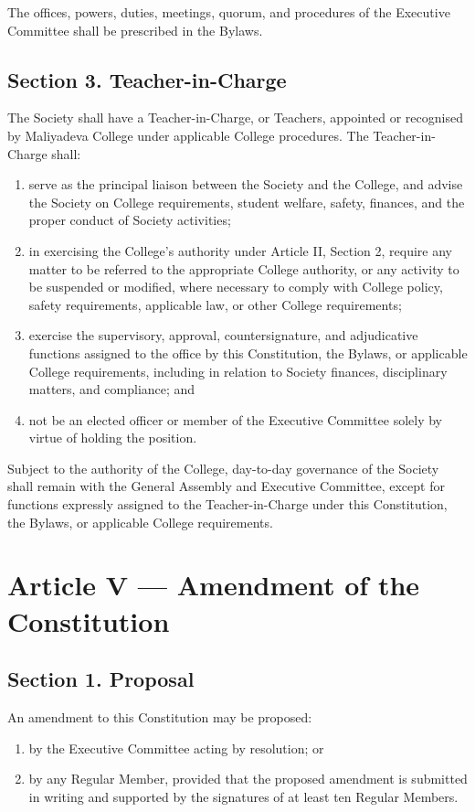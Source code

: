 \documentclass[11pt,a4paper]{article}
\begin{document}
The offices, powers, duties, meetings, quorum, and procedures of the Executive
Committee shall be prescribed in the Bylaws.

\subsection*{Section 3. Teacher-in-Charge}

    The Society shall have a Teacher-in-Charge, or Teachers, appointed or recognised by Maliyadeva College under applicable College procedures. The Teacher-in-Charge shall:
\begin{enumerate}
 \item serve as the principal liaison between the Society and the College, and advise the Society on College requirements, student welfare, safety, finances, and the proper conduct of Society activities;
 \item in exercising the College's authority under Article II, Section 2, require any matter to be referred to the appropriate College authority, or any activity to be suspended or modified, where necessary to comply with College policy, safety requirements, applicable law, or other College requirements;
 \item exercise the supervisory, approval, countersignature, and adjudicative functions assigned to the office by this Constitution, the Bylaws, or applicable College requirements, including in relation to Society finances, disciplinary matters, and compliance; and
 \item not be an elected officer or member of the Executive Committee solely by virtue of holding the position.
\end{enumerate}


    Subject to the authority of the College, day-to-day governance of the Society shall remain with the General Assembly and Executive Committee, except for functions expressly assigned to the Teacher-in-Charge under this Constitution, the Bylaws, or applicable College requirements.



\section*{Article V --- Amendment of the Constitution}

\subsection*{Section 1. Proposal}
An amendment to this Constitution may be proposed:
\begin{enumerate}[leftmargin=*]
    \item by the Executive Committee acting by resolution; or
    \item by any Regular Member, provided that the proposed amendment is submitted in writing and supported by the signatures of at least ten Regular Members.
\end{enumerate}
\end{document}
